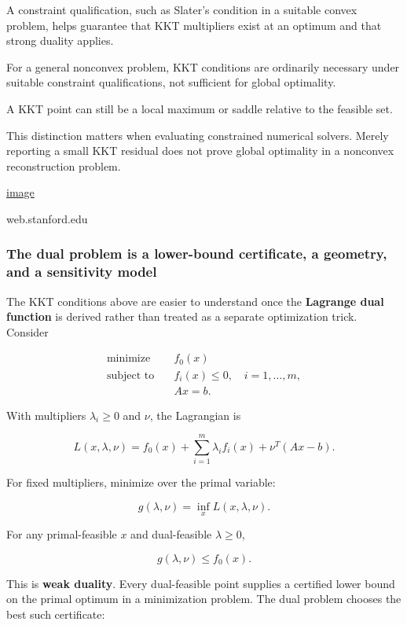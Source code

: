 A constraint qualification, such as Slater's condition in a suitable convex problem, helps guarantee that KKT multipliers exist at an optimum and that strong duality applies.

For a general nonconvex problem, KKT conditions are ordinarily necessary under suitable constraint qualifications, not sufficient for global optimality.

A KKT point can still be a local maximum or saddle relative to the feasible set.

This distinction matters when evaluating constrained numerical solvers. Merely reporting a small KKT residual does not prove global optimality in a nonconvex reconstruction problem. 

\href{https://www.google.com/s2/favicons?domain=https://web.stanford.edu&sz=32}{image}

web.stanford.edu

\subsubsection{The dual problem is a lower-bound certificate, a geometry, and a sensitivity model}\label{the-dual-problem-is-a-lower-bound-certificate-a-geometry-and-a-sensitivity-model}

The KKT conditions above are easier to understand once the \textbf{Lagrange dual function} is derived rather than treated as a separate optimization trick. Consider

\[
\begin{aligned}
\text{minimize}\quad & f_0(x)\\
\text{subject to}\quad & f_i(x)\le 0,\quad i=1,\ldots,m,\\
& Ax=b.
\end{aligned}
\]

With multipliers \(\lambda_i\ge0\) and \(\nu\), the Lagrangian is

\[
L(x,\lambda,\nu)
=
f_0(x)
+
\sum_{i=1}^{m}\lambda_i f_i(x)
+
\nu^T(Ax-b).
\]

For fixed multipliers, minimize over the primal variable:

\[
g(\lambda,\nu)
=
\inf_x L(x,\lambda,\nu).
\]

For any primal-feasible \(x\) and dual-feasible \(\lambda\ge0\),

\[
g(\lambda,\nu)
\le
f_0(x).
\]

This is \textbf{weak duality}. Every dual-feasible point supplies a certified lower bound on the primal optimum in a minimization problem. The dual problem chooses the best such certificate:

